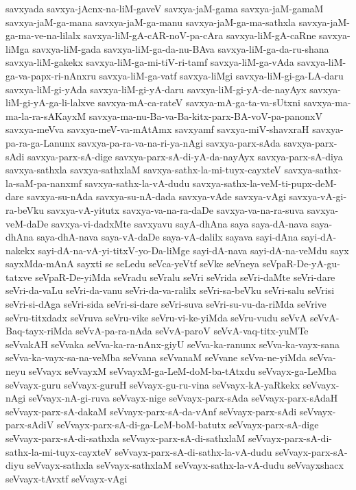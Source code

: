 {savxyada
savxya-jAcnx-na-liM-gaveV
savxya-jaM-gama
savxya-jaM-gamaM
savxya-jaM-ga-mana
savxya-jaM-ga-manu
savxya-jaM-ga-ma-sathxla
savxya-jaM-ga-ma-ve-na-lilalx
savxya-liM-gA-cAR-noV-pa-cAra
savxya-liM-gA-caRne
savxya-liMga
savxya-liM-gada
savxya-liM-ga-da-nu-BAva
savxya-liM-ga-da-ru-shana
savxya-liM-gakekx
savxya-liM-ga-mi-tiV-ri-tamf
savxya-liM-ga-vAda
savxya-liM-ga-va-papx-ri-nAnxru
savxya-liM-ga-vatf
savxya-liMgi
savxya-liM-gi-ga-LA-daru
savxya-liM-gi-yAda
savxya-liM-gi-yA-daru
savxya-liM-gi-yA-de-nayAyx
savxya-liM-gi-yA-ga-li-lalxve
savxya-mA-ca-rateV
savxya-mA-ga-ta-va-sUtxni
savxya-ma-ma-la-ra-sAKayxM
savxya-ma-nu-Ba-va-Ba-kitx-parx-BA-voV-pa-panonxV
savxya-meVva
savxya-meV-va-mAtAmx
savxyamf
savxya-miV-shavxraH
savxya-pa-ra-ga-Lanunx
savxya-pa-ra-va-na-ri-ya-nAgi
savxya-parx-sAda
savxya-parx-sAdi
savxya-parx-sA-dige
savxya-parx-sA-di-yA-da-nayAyx
savxya-parx-sA-diya
savxya-sathxla
savxya-sathxlaM
savxya-sathx-la-mi-tuyx-cayxteV
savxya-sathx-la-saM-pa-nanxmf
savxya-sathx-la-vA-dudu
savxya-sathx-la-veM-ti-pupx-deM-dare
savxya-su-nAda
savxya-su-nA-dada
savxya-vAde
savxya-vAgi
savxya-vA-gi-ra-beVku
savxya-vA-yitutx
savxya-va-na-ra-daDe
savxya-va-na-ra-suva
savxya-veM-daDe
savxya-vi-dadxMte
savxyavu
sayA-dhAna
saya
saya-dA-nava
saya-dhAna
saya-dhA-nava
saya-vA-daDe
saya-vA-dalilx
sayava
sayi-dAna
sayi-dA-nakekx
sayi-dA-na-vA-yi-titxV-yo-Da-liMge
sayi-dA-nava
sayi-dA-na-veMdu
sayx
sayxMda-mAnA
sayxti
se
seLedu
seVca-yeVtf
seVke
seVneya
seVpaR-De-yA-gu-tatxve
seVpaR-De-yiMda
seVradu
seVralu
seVri
seVrida
seVri-daMte
seVri-dare
seVri-da-vaLu
seVri-da-vanu
seVri-da-va-ralilx
seVri-sa-beVku
seVri-salu
seVrisi
seVri-si-dAga
seVri-sida
seVri-si-dare
seVri-suva
seVri-su-vu-da-riMda
seVrive
seVru-titxdadx
seVruva
seVru-vike
seVru-vi-ke-yiMda
seVru-vudu
seVvA
seVvA-Baq-tayx-riMda
seVvA-pa-ra-nAda
seVvA-paroV
seVvA-vaq-titx-yuMTe
seVvakAH
seVvaka
seVva-ka-ra-nAnx-giyU
seVva-ka-ranunx
seVva-ka-vayx-sana
seVva-ka-vayx-sa-na-veMba
seVvana
seVvanaM
seVvane
seVva-ne-yiMda
seVva-neyu
seVvayx
seVvayxM
seVvayxM-ga-LeM-doM-ba-tAtxdu
seVvayx-ga-LeMba
seVvayx-guru
seVvayx-guruH
seVvayx-gu-ru-vina
seVvayx-kA-yaRkekx
seVvayx-nAgi
seVvayx-nA-gi-ruva
seVvayx-nige
seVvayx-parx-sAda
seVvayx-parx-sAdaH
seVvayx-parx-sA-dakaM
seVvayx-parx-sA-da-vAnf
seVvayx-parx-sAdi
seVvayx-parx-sAdiV
seVvayx-parx-sA-di-ga-LeM-boM-batutx
seVvayx-parx-sA-dige
seVvayx-parx-sA-di-sathxla
seVvayx-parx-sA-di-sathxlaM
seVvayx-parx-sA-di-sathx-la-mi-tuyx-cayxteV
seVvayx-parx-sA-di-sathx-la-vA-dudu
seVvayx-parx-sA-diyu
seVvayx-sathxla
seVvayx-sathxlaM
seVvayx-sathx-la-vA-dudu
seVvayxshacx
seVvayx-tAvxtf
seVvayx-vAgi
}

